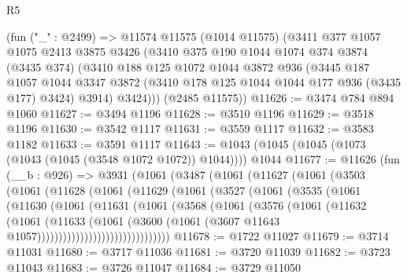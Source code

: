 \begin{lexlean}{R5}
\begin{coremodule}
    (fun ("_" : @2499) =>
    @11574
      @11575
      (@1014 @11575)
      (@3411
        @377
        @1057
        @1075
        @2413
        @3875
        @3426
        (@3410
          @375
          @190
          @1044
          @1074
          @374
          @3874
          (@3435 @374)
          (@3410
            @188
            @125
            @1072
            @1044
            @3872
            @936
            (@3445
              @187
              @1057
              @1044
              @3347
              @3872
              (@3410 @178 @125 @1044 @1044 @177 @936 (@3435 @177) @3424)
              @3914)
            @3424)))
      (@2485 @11575))
@11626 := @3474 @784 @894 @1060
@11627 := @3494 @1196
@11628 := @3510 @1196
@11629 := @3518 @1196
@11630 := @3542 @1117
@11631 := @3559 @1117
@11632 := @3583 @1182
@11633 := @3591 @1117
@11643 := @1043 (@1045 (@1045 (@1073 (@1043 (@1045 (@3548 @1072 @1072)) @1044)))) @1044
@11677 := @11626
    (fun (__b : @926) =>
    @3931
      (@1061
        (@3487
          (@1061
            (@11627
              (@1061
                (@3503
                  (@1061
                    (@11628
                      (@1061
                        (@11629
                          (@1061
                            (@3527
                              (@1061
                                (@3535
                                  (@1061
                                    (@11630
                                      (@1061
                                        (@11631
                                          (@1061
                                            (@3568
                                              (@1061
                                                (@3576
                                                  (@1061
                                                    (@11632
                                                      (@1061
                                                        (@11633
                                                          (@1061
                                                            (@3600
                                                              (@1061
                                                                (@3607
                                                                  @11643
                                                                  @1057)))))))))))))))))))))))))))))))
@11678 := @1722 @11027
@11679 := @3714 @11031
@11680 := @3717 @11036
@11681 := @3720 @11039
@11682 := @3723 @11043
@11683 := @3726 @11047
@11684 := @3729 @11050

\end{coremodule}
\end{lexlean}
